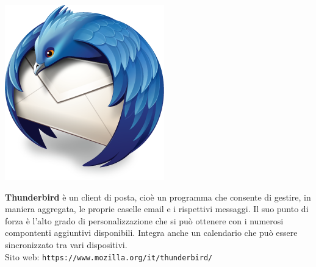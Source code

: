 \documentclass[a4paper, 12pt]{extarticle}
\begin{document}
\begin{minipage}{.2\linewidth}
    \includegraphics[width=.9\linewidth]{img/opuscolo-9.png}
\end{minipage}
\begin{minipage}{.75\linewidth}
\textbf{Thunderbird} è un client di posta, cioè un programma che consente di gestire, in maniera aggregata, le proprie
caselle email e i rispettivi messaggi. Il suo punto di forza è l'alto grado di personalizzazione che si può ottenere
con i numerosi compontenti aggiuntivi disponibili. Integra anche un calendario che può essere sincronizzato tra vari
dispositivi.\\
Sito web: \texttt{https://www.mozilla.org/it/thunderbird/}
\end{minipage}
\end{document}
